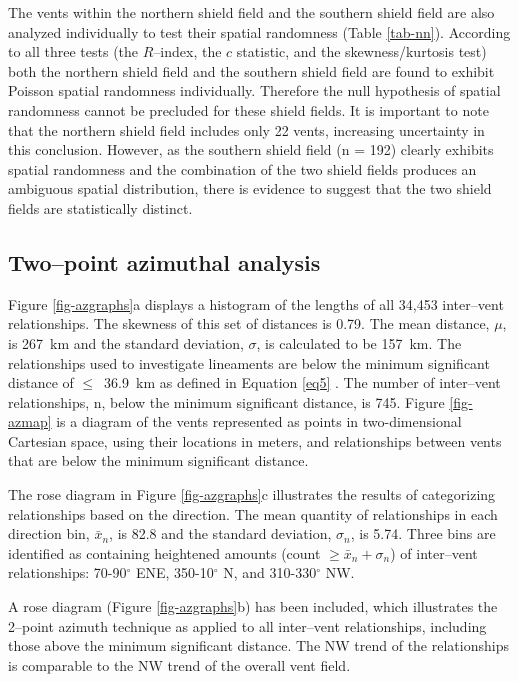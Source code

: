 \documentclass[preprint,review,authoryear,12pt]{elsarticle}
\begin{document}
The vents within the northern shield field and the southern shield field are also analyzed individually to test their spatial randomness (Table \ref{tab-nn}). According to all three tests (the $R$--index, the $c$ statistic, and the skewness/kurtosis test) both the northern shield field and the southern shield field are found to exhibit Poisson spatial randomness individually. Therefore the null hypothesis of spatial randomness cannot be precluded for these shield fields. It is important to note that the northern shield field includes only 22 vents, increasing uncertainty in this conclusion. However, as the  southern shield field (n = 192) clearly exhibits spatial randomness and the combination of the two shield fields produces an ambiguous spatial distribution, there is evidence to suggest that the two shield fields are statistically distinct.

\subsection{Two--point azimuthal analysis}

Figure \ref{fig-azgraphs}a displays a histogram of the lengths of all 34,453 inter--vent relationships. The skewness of this set of distances is 0.79. The mean distance, $\mu$, is 267~km and the standard deviation, $\sigma$, is calculated to be 157~km. The relationships used to investigate lineaments are below the minimum significant distance of $\le$~36.9~km as defined in Equation \ref{eq5} \citep{Cebria2011}. The number of inter--vent relationships, n, below the minimum significant distance, is 745. Figure \ref{fig-azmap} is a diagram of the vents represented as points in two-dimensional Cartesian space, using their locations in meters, and relationships between vents that are below the minimum significant distance.

The rose diagram in Figure \ref{fig-azgraphs}c illustrates the results of categorizing relationships based on the direction. The mean quantity of relationships in each direction bin, $\bar{x}_n$, is 82.8 and the standard deviation, $\sigma_n$, is 5.74. Three bins are identified as containing heightened amounts (count $\ge \bar{x}_n + \sigma_n$) of inter--vent relationships: 70-90$^{\circ}$ ENE, 350-10$^{\circ}$ N, and 310-330$^{\circ}$ NW.

A rose diagram (Figure \ref{fig-azgraphs}b) has been included, which illustrates the 2--point azimuth technique as applied to all inter--vent relationships, including those above the minimum significant distance. The NW trend of the relationships is comparable to the NW trend of the overall vent field.
\end{document}
